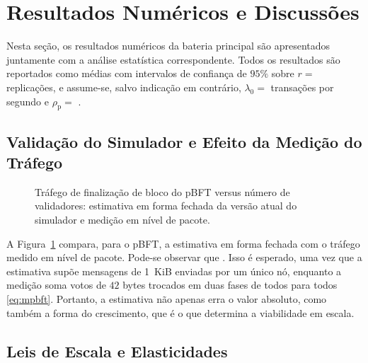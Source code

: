 \section{Resultados Numéricos e Discussões}
\label{sec:results}

Nesta seção, os resultados numéricos da bateria principal são apresentados juntamente com a análise estatística correspondente. Todos os resultados são reportados como médias com intervalos de confiança de $95\%$ sobre $r = $  replicações, e assume-se, salvo indicação em contrário, $\lambda_{0} = $  transações por segundo e $\rho_{\mathrm{p}} = $ .

\subsection{Validação do Simulador e Efeito da Medição do Tráfego}

\begin{figure}[!ht]
\centering
{}
\caption{Tráfego de finalização de bloco do pBFT versus número de validadores: estimativa em forma fechada da versão atual do simulador e medição em nível de pacote.}
\label{fig:artifact}
\end{figure}

 A Figura~\ref{fig:artifact} compara, para o pBFT, a estimativa em forma fechada com o tráfego medido em nível de pacote. Pode-se observar que . Isso é esperado, uma vez que a estimativa supõe mensagens de 1~KiB enviadas por um único nó, enquanto a medição soma votos de $42$ bytes trocados em duas fases de todos para todos \eqref{eq:mpbft}. Portanto, a estimativa não apenas erra o valor absoluto, como também a forma do crescimento, que é o que determina a viabilidade em escala.

\subsection{Leis de Escala e Elasticidades}

